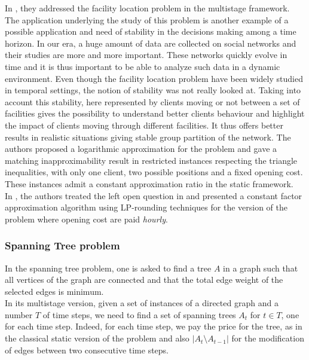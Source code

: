 \documentclass[a4paper]{book}
\begin{document}
In \cite{Eisenstat}, they addressed the {\sc facility location }problem in the multistage framework. The application underlying the study of this problem is another example of a possible application and need of stability in the decisions making among a time horizon. In our era, a huge amount of data are collected on social networks and their studies are more and more important. These networks quickly evolve in time and it is thus important to be able to analyze such data in a dynamic environment. Even though the {\sc facility location} problem have been widely studied in temporal settings, the notion of stability was not really looked at. Taking into account this stability, here represented by clients moving or not between a set of facilities gives the possibility to understand better clients behaviour and highlight the impact of clients moving through different facilities. It thus offers better results in realistic situations giving stable group partition of the network. The authors proposed a logarithmic approximation for the problem and gave a matching inapproximability result in restricted instances respecting the triangle inequalities, with only one client, two possible positions and a fixed opening cost. These instances admit a constant approximation ratio in the static framework. \\

In \cite{an2017dynamic}, the authors treated the left open question in \cite{Eisenstat} and presented a constant factor approximation algorithm using LP-rounding techniques for the version of the problem where opening cost are paid \textit{hourly}.

\subsubsection{Spanning Tree problem}

In the {\sc spanning tree} problem, one is asked to find a tree $A$ in a graph such that all vertices of the graph are connected and that the total edge weight of the selected edges is minimum.\\
In its multistage version, given a set of instances of a directed graph and a number $T$ of time steps, we need to find a set of spanning trees $A_t $ for $t \in T$, one for each time step. Indeed, for each time step, we pay the price for the tree, as in the classical static version of the problem and also $|A_t \setminus A_{t-1} |$ for the modification of edges between two consecutive time steps. \\
\end{document}
